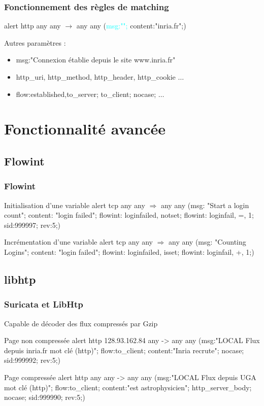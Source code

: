 \documentclass{beamer}
\begin{document}
\begin{frame}
\frametitle{Fonctionnement des règles de matching}
\begin{block}{}
alert http any any $\rightarrow$ any any (\textcolor{cyan}{msg:"";} content:"inria.fr";)
\end{block}
Autres paramètres :
\begin{itemize}
[triangle]
\item msg:"Connexion établie depuis le site www.inria.fr"
\item http\_uri, http\_method, http\_header, http\_cookie $\ldots$
\item flow:established,to\_server; to\_client; nocase; $\ldots$
\end{itemize}
\end{frame}

\section{Fonctionnalité avancée}
\subsection{Flowint}
\begin{frame}
\frametitle{Flowint}
\begin{block}{Initialisation d'une variable}
alert tcp any any $ \Rightarrow $ any any (msg: "Start a login count"; content: "login failed"; flowint: loginfailed, notset; flowint: loginfail, =, 1; sid:999997; rev:5;)
\end{block}
\pause
\begin{block}{Incrémentation d'une variable}
alert tcp any any $ \Rightarrow $ any any (msg: "Counting Logins"; content: "login failed"; flowint: loginfailed, isset; flowint: loginfail, +, 1;)
\end{block}
\end{frame}


\subsection{libhtp}
\begin{frame}
\frametitle{Suricata et LibHtp}
Capable de décoder des flux compressés par Gzip
\begin{block}{Page non compressée}
alert http 128.93.162.84 any -> any any (msg:"LOCAL Flux depuis inria.fr mot clé (http)"; flow:to\_client; content:"Inria recrute"; nocase; sid:999992; rev:5;)
\end{block}
\begin{block}{Page compressée}
alert http any any -> any any (msg:"LOCAL Flux depuis UGA mot clé (http)"; flow:to\_client; content:"est astrophysicien"; http\_server\_body; nocase; sid:999990; rev:5;)
\end{block}
\end{frame}
\end{document}
